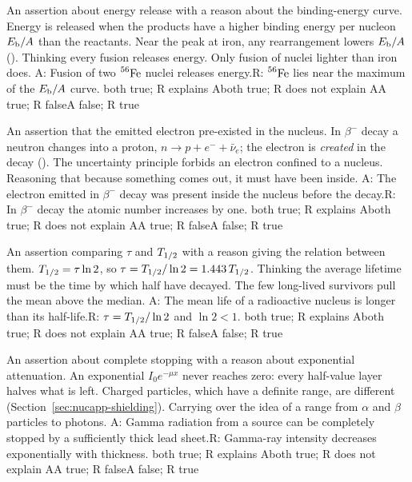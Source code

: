 {An assertion about energy release with a reason about the binding-energy curve.}
{Energy is released when the products have a higher binding energy per nucleon $E_{\mathrm{b}}/A$ than the reactants.
Near the peak at iron, any rearrangement lowers $E_{\mathrm{b}}/A$ ().}
{Thinking every fusion releases energy. Only fusion of nuclei lighter than iron does.}
{A: Fusion of two $\prescript{56}{}{\mathrm{Fe}}$ nuclei releases energy.\quad R: $\prescript{56}{}{\mathrm{Fe}}$ lies near the maximum of the
$E_{\mathrm{b}}/A$ curve.}
{both true; R explains A}{both true; R does not explain A}{A true; R false}{A false; R true}

{An assertion that the emitted electron pre-existed in the nucleus.}
{In $\beta^-$ decay a neutron changes into a proton, $n\to p+e^-+\bar\nu_e$; the electron is \emph{created} in
the decay (). The uncertainty principle forbids an electron confined to a nucleus.}
{Reasoning that because something comes out, it must have been inside.}
{A: The electron emitted in $\beta^-$ decay was present inside the nucleus before the decay.\quad R: In $\beta^-$
decay the atomic number increases by one.}
{both true; R explains A}{both true; R does not explain A}{A true; R false}{A false; R true}

{An assertion comparing $\tau$ and $T_{1/2}$ with a reason giving the relation between them.}
{$T_{1/2}=\tau\ln2$, so $\tau=T_{1/2}/\ln2=1.443\,T_{1/2}$.}
{Thinking the average lifetime must be the time by which half have decayed. The few long-lived survivors pull
the mean above the median.}
{A: The mean life of a radioactive nucleus is longer than its half-life.\quad R: $\tau=T_{1/2}/\ln2$ and $\ln2<1$.}
{both true; R explains A}{both true; R does not explain A}{A true; R false}{A false; R true}

{An assertion about complete stopping with a reason about exponential attenuation.}
{An exponential $I_0e^{-\mu x}$ never reaches zero: every half-value layer halves what is left. Charged particles,
which have a definite range, are different (Section~\ref{sec:nucapp-shielding}).}
{Carrying over the idea of a range from $\alpha$ and $\beta$ particles to photons.}
{A: Gamma radiation from a source can be completely stopped by a sufficiently thick lead sheet.\quad R:
Gamma-ray intensity decreases exponentially with thickness.}
{both true; R explains A}{both true; R does not explain A}{A true; R false}{A false; R true}

